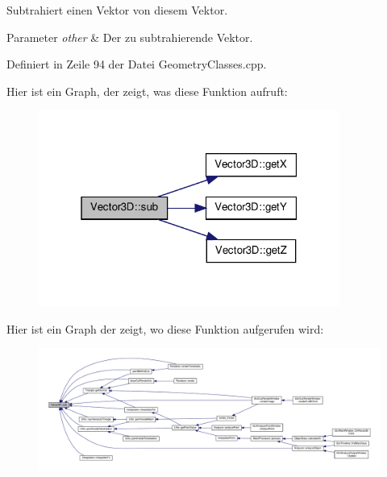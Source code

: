 Subtrahiert einen Vektor von diesem Vektor. 


\begin{DoxyParams}{Parameter}
{\em other} & Der zu subtrahierende Vektor. \\
\hline
\end{DoxyParams}


Definiert in Zeile 94 der Datei Geometry\-Classes.\-cpp.



Hier ist ein Graph, der zeigt, was diese Funktion aufruft\-:\nopagebreak
\begin{figure}[H]
\begin{center}
\leavevmode
\includegraphics[width=280pt]{classVector3D_a02364a41693ac080f5adadd776df74b4_cgraph}
\end{center}
\end{figure}




Hier ist ein Graph der zeigt, wo diese Funktion aufgerufen wird\-:
\nopagebreak
\begin{figure}[H]
\begin{center}
\leavevmode
\includegraphics[width=350pt]{classVector3D_a02364a41693ac080f5adadd776df74b4_icgraph}
\end{center}
\end{figure}




